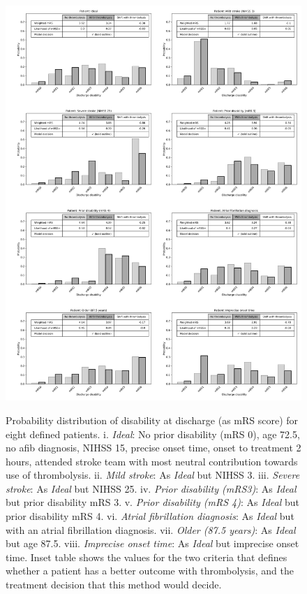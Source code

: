 \begin{figure}
\centering
 {\includegraphics[width = 6.1in]{./images/060_xgb_mrs_distributions_bar_plot_table_bw.jpg}}\\%
 \caption{Probability distribution of disability at discharge (as mRS score) for eight defined patients. i. \textit{Ideal}: No prior disability (mRS 0), age 72.5, no afib diagnosis, NIHSS 15, precise onset time, onset to treatment 2 hours, attended stroke team with most neutral contribution towards use of thrombolysis. ii. \textit{Mild stroke}: As \textit{Ideal} but NIHSS 3. iii. \textit{Severe stroke}: As \textit{Ideal} but NIHSS 25. iv. \textit{Prior disability (mRS3)}: As \textit{Ideal} but prior disability mRS 3. v. \textit{Prior disability (mRS 4)}:  As \textit{Ideal} but prior disability mRS 4. vi. \textit{Atrial fibrillation diagnosis}: As \textit{Ideal} but with an atrial fibrillation diagnosis. vii. \textit{Older (87.5 years)}: As \textit{Ideal} but age 87.5. viii. \textit{Imprecise onset time}: As \textit{Ideal} but imprecise onset time. Inset table shows the values for the two criteria that defines whether a patient has a better outcome with thrombolysis, and the treatment decision that this method would decide.}
 \label{fig:counterfactual_bar_plot}
\end{figure}

